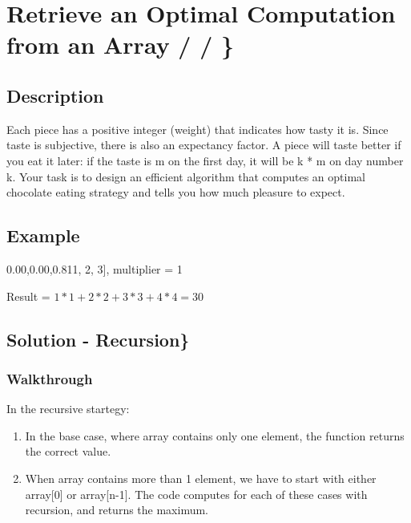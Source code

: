 \documentclass[]{book}
\newenvironment{Shaded}{\begin{snugshade}}{\end{snugshade}}
\newcommand{\DecValTok}[1]{\textcolor[rgb]{0.00,0.00,0.81}{#1}}
\newcommand{\NormalTok}[1]{#1}
\begin{document}
\hypertarget{retrieve-an-optimal-computation-from-an-array}{%
\section{Retrieve an Optimal Computation from an Array / / \}}\label{retrieve-an-optimal-computation-from-an-array}}

\hypertarget{description-37}{%
\subsection{Description}\label{description-37}}

Each piece has a positive integer (weight) that indicates how tasty it is. Since taste is subjective, there is also an
expectancy factor. A piece will taste better if you eat it later: if the taste is m on the first day, it
will be k * m on day number k. Your task is to design an efficient algorithm that computes an optimal chocolate eating
strategy and tells you how much pleasure to expect.

\hypertarget{example-36}{%
\subsection{Example}\label{example-36}}

\begin{Shaded}
\begin{Highlighting}[]
\NormalTok{[}\DecValTok{1}\NormalTok{, }\DecValTok{2}\NormalTok{, }\DecValTok{3}\NormalTok{], multiplier = }\DecValTok{1}
\end{Highlighting}
\end{Shaded}

Result = \(1 * 1 + 2 * 2 + 3 * 3 + 4 * 4= 30\)

\hypertarget{solution---recursion}{%
\subsection{Solution - Recursion\}}\label{solution---recursion}}

\hypertarget{walkthrough-36}{%
\subsubsection{Walkthrough}\label{walkthrough-36}}

In the recursive startegy:

\begin{enumerate}
    \item In the base case, where array contains only one element, the function returns the correct value.
    \item When array contains more than 1 element, we have to start with either array[0] or array[n-1]. The code
computes for each of these cases with recursion, and returns the maximum.
\end{enumerate}
\end{document}
